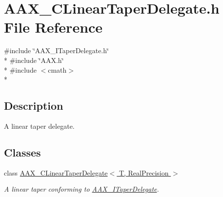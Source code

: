 \hypertarget{a00175}{}\section{A\+A\+X\+\_\+\+C\+Linear\+Taper\+Delegate.\+h File Reference}
\label{a00175}
{\ttfamily \#include \char`\"{}A\+A\+X\+\_\+\+I\+Taper\+Delegate.\+h\char`\"{}}\\*
{\ttfamily \#include \char`\"{}A\+A\+X.\+h\char`\"{}}\\*
{\ttfamily \#include $<$cmath$>$}\\*


\subsection{Description}
A linear taper delegate. 

\subsection*{Classes}
\begin{DoxyCompactItemize}
\item 
class \hyperlink{a00022}{A\+A\+X\+\_\+\+C\+Linear\+Taper\+Delegate$<$ T, Real\+Precision $>$}
\begin{DoxyCompactList}\small\item\em A linear taper conforming to \hyperlink{a00114}{A\+A\+X\+\_\+\+I\+Taper\+Delegate}. \end{DoxyCompactList}\end{DoxyCompactItemize}
